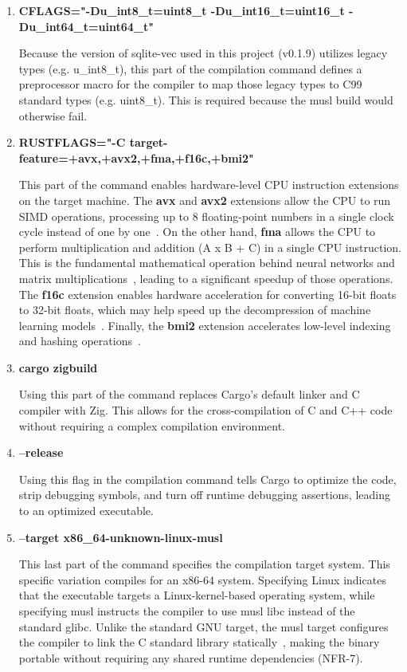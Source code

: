 \begin{enumerate}
    \item \textbf{CFLAGS="-Du\_int8\_t=uint8\_t -Du\_int16\_t=uint16\_t -Du\_int64\_t=uint64\_t"} 
    
    Because the version of sqlite-vec used in this project (v0.1.9) utilizes legacy types (e.g. u\_int8\_t), this part of the compilation command defines a preprocessor macro for the compiler to map those legacy types to C99 standard types (e.g. uint8\_t). This is required because the musl build would otherwise fail.
    
    \item \textbf{RUSTFLAGS="-C target-feature=+avx,+avx2,+fma,+f16c,+bmi2"}
    
    This part of the command enables hardware-level CPU instruction extensions on the target machine. The \textbf{avx} and \textbf{avx2} extensions allow the CPU to run \ac{SIMD} operations, processing up to 8 floating-point numbers in a single clock cycle instead of one by one~\cite{intel_sdm_2024}. On the other hand, \textbf{fma} allows the CPU to perform multiplication and addition (A x B + C) in a single CPU instruction. This is the fundamental mathematical operation behind neural networks and matrix multiplications~\cite{intel_sdm_2024}, leading to a significant speedup of those operations. The \textbf{f16c} extension enables hardware acceleration for converting 16-bit floats to 32-bit floats, which may help speed up the decompression of machine learning models~\cite{intel_sdm_2024}. Finally, the \textbf{bmi2} extension accelerates low-level indexing and hashing operations~\cite{intel_sdm_2024}.
    
    \item \textbf{cargo zigbuild}
    
    Using this part of the command replaces Cargo's default linker and C compiler with Zig. This allows for the cross-compilation of C and C++ code without requiring a complex compilation environment. 
    
    \item \textbf{--release}
    
    Using this flag in the compilation command tells Cargo to optimize the code, strip debugging symbols, and turn off runtime debugging assertions, leading to an optimized executable.
    
    \item \textbf{--target x86\_64-unknown-linux-musl}
    
    This last part of the command specifies the compilation target system. This specific variation compiles for an x86-64 system. Specifying Linux indicates that the executable targets a Linux-kernel-based operating system, while specifying musl instructs the compiler to use musl libc instead of the standard glibc. Unlike the standard GNU target, the musl target configures the compiler to link the C standard library statically~\cite{rust_rfc_crt_static}, making the binary portable without requiring any shared runtime dependencies (NFR-7).
\end{enumerate}

